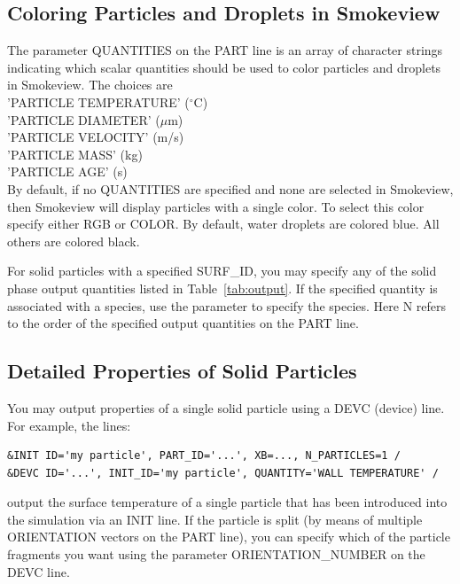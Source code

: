 \documentclass[11pt]{book}
\begin{document}
\subsection{Coloring Particles and Droplets in Smokeview}

The parameter {\ct QUANTITIES} on the {\ct PART} line is an array of character strings indicating which scalar quantities should be used to color particles and droplets in Smokeview. The choices are \\
{\ct 'PARTICLE TEMPERATURE'} ($^\circ$C) \\
{\ct 'PARTICLE DIAMETER'} ($\mu$m) \\
{\ct 'PARTICLE VELOCITY'} (m/s) \\
{\ct 'PARTICLE MASS'} (kg) \\
{\ct 'PARTICLE AGE'} (s) \\
By default, if no {\ct QUANTITIES} are specified and none are selected in Smokeview, then Smokeview will display particles with a single color. To select this color specify either {\ct RGB} or {\ct COLOR}. By default, water droplets are colored blue. All others are colored black.

For solid particles with a specified {\ct SURF\_ID}, you may specify any of the solid phase output quantities listed in Table~\ref{tab:output}. If the specified quantity is associated with a species, use the parameter  to specify the species. Here {\ct N} refers to the order of the specified output quantities on the {\ct PART} line.


\subsection{Detailed Properties of Solid Particles}

You may output properties of a single solid particle using a {\ct DEVC} (device) line. For example, the lines:
\begin{lstlisting}
&INIT ID='my particle', PART_ID='...', XB=..., N_PARTICLES=1 /
&DEVC ID='...', INIT_ID='my particle', QUANTITY='WALL TEMPERATURE' /
\end{lstlisting}
output the surface temperature of a single particle that has been introduced into the simulation via an {\ct INIT} line. If the particle is split (by means of multiple {\ct ORIENTATION} vectors on the {\ct PART} line), you can specify which of the particle fragments you want using the parameter {\ct ORIENTATION\_NUMBER} on the {\ct DEVC} line.
\end{document}
